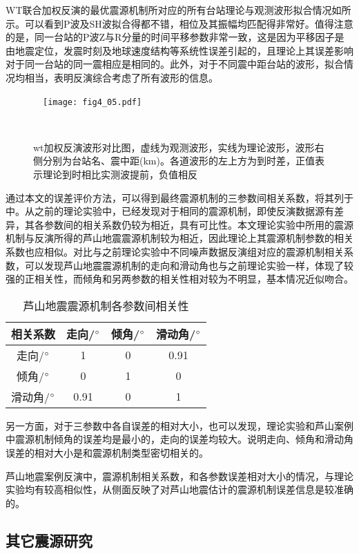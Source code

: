 WT联合加权反演的最优震源机制所对应的所有台站理论与观测波形拟合情况如所示。可以看到P波及SH波拟合得都不错，相位及其振幅均匹配得非常好。值得注意的是，同一台站的P波Z与R分量的时间平移参数非常一致，这是因为平移因子是由地震定位，发震时刻及地球速度结构等系统性误差引起的，且理论上其误差影响对于同一台站的同一震相应是相同的。此外，对于不同震中距台站的波形，拟合情况均相当，表明反演综合考虑了所有波形的信息。
\begin{figure}
\centering
  \texttt{[image: fig4\_05.pdf]}
  \caption{ wt加权反演波形对比图，虚线为观测波形，实线为理论波形，波形右侧分别为台站名、震中距(km)。各道波形的左上方为到时差，正值表示理论到时相比实测波提前，负值相反}
  \label{fig4_05}
\end{figure}

通过本文的误差评价方法，可以得到最终震源机制的三参数间相关系数，将其列于中。从之前的理论实验中，已经发现对于相同的震源机制，即使反演数据源有差异，其各参数间的相关系数仍较为相近，具有可比性。本文理论实验中所用的震源机制与反演所得的芦山地震震源机制较为相近，因此理论上其震源机制参数的相关系数也应相似。对比与之前理论实验中不同噪声数据反演组对应的震源机制相关系数，可以发现芦山地震震源机制的走向和滑动角也与之前理论实验一样，体现了较强的正相关性，而倾角和另两参数的相关性相对较为不明显，基本情况近似吻合。
\begin{table}[ht]
\centering
\caption{芦山地震震源机制各参数间相关性}
\label{tab4_03}
    \begin{tabular}{c c c c}
    \hline
    相关系数 & 走向/$^\circ$ & 倾角/$^\circ$ & 滑动角/$^\circ$ \\
    \hline
	走向/$^\circ$ 		&1 			&0			&0.91\\
	倾角/$^\circ$		&0			&1			&0\\
	滑动角/$^\circ$	&0.91		&0			&1\\
    \hline
    \end{tabular}
\end{table}

另一方面，对于三参数中各自误差的相对大小，也可以发现，理论实验和芦山案例中震源机制倾角的误差均是最小的，走向的误差均较大。说明走向、倾角和滑动角误差的相对大小是和震源机制类型密切相关的。

芦山地震案例反演中，震源机制相关系数，和各参数误差相对大小的情况，与理论实验均有较高相似性，从侧面反映了对芦山地震估计的震源机制误差信息是较准确的。

\subsection{其它震源研究}

